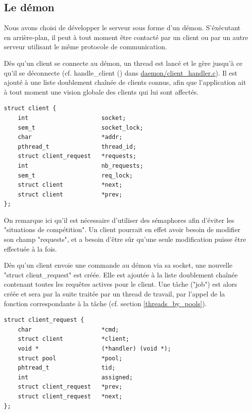 	
\subsection{Le démon}

    Nous avons choisi de développer le serveur sous forme d'un démon.
S'éxécutant en arrière-plan, il peut à tout moment être contacté par un client
ou par un autre serveur utilisant le même protocole de communication.

    Dès qu'un client se connecte au démon, un thread est lancé et le gère
jusqu'à ce qu'il se déconnecte (cf. handle\_client () dans
\url{daemon/client_handler.c}). Il est ajouté à une liste doublement chaînée de
 clients connus, afin que l'application ait à tout moment une vision globale 
des clients qui lui sont affectés. 

\begin{lstlisting}
struct client {
    int                     socket;
    sem_t                   socket_lock;
    char                    *addr;
    pthread_t               thread_id;
    struct client_request   *requests;
    int                     nb_requests;
    sem_t                   req_lock;
    struct client           *next;
    struct client           *prev;
};
\end{lstlisting}

    On remarque ici qu'il est nécessaire d'utiliser des sémaphores afin d'éviter
les "situations de compétition". Un client pourrait en effet avoir besoin de
modifier son champ "requests", et a besoin d'être sûr qu'une seule modification
puisse être effectuée à la fois.

    Dès qu'un client envoie une commande au démon via sa socket, une nouvelle
"struct client\_request" est créée. Elle est ajoutée à la liste doublement
chaînée contenant toutes les requêtes actives pour le client. Une tâche ("job") 
est alors créée et sera par la suite traitée par un thread de travail, par 
l'appel de la fonction correspondante à la tâche (cf. section 
\ref{threads_by_pools}).

\begin{lstlisting}
struct client_request {
    char                    *cmd;
    struct client           *client;
    void *                  (*handler) (void *);
    struct pool             *pool;
    phtread_t               tid;
    int                     assigned;
    struct client_request   *prev;
    struct client_request   *next;
};
\end{lstlisting}

